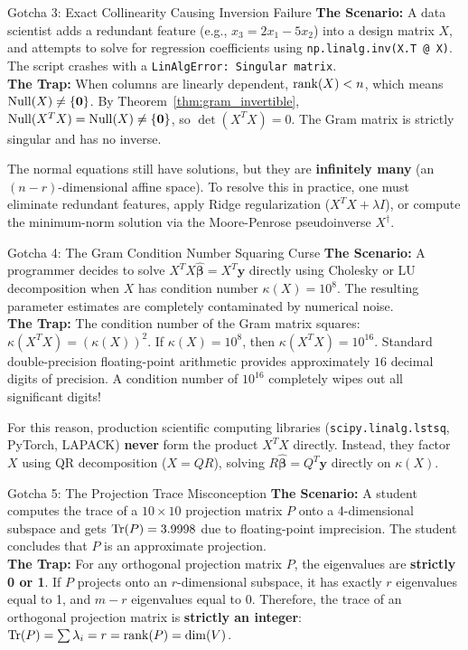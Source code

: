 \begin{trapbox}{Gotcha 3: Exact Collinearity Causing Inversion Failure}
\textbf{The Scenario:} A data scientist adds a redundant feature (e.g., $x_3 = 2x_1 - 5x_2$) into a design matrix $X$, and attempts to solve for regression coefficients using \texttt{np.linalg.inv(X.T @ X)}. The script crashes with a \texttt{LinAlgError: Singular matrix}. \\
\textbf{The Trap:} When columns are linearly dependent, $\operatorname{rank}(X) < n$, which means $\operatorname{Null}(X) \ne \{\mathbf{0}\}$. By Theorem~\ref{thm:gram_invertible}, $\operatorname{Null}(X^T X) = \operatorname{Null}(X) \ne \{\mathbf{0}\}$, so $\det(X^T X) = 0$. The Gram matrix is strictly singular and has no inverse. 

The normal equations still have solutions, but they are \textbf{infinitely many} (an $(n-r)$-dimensional affine space). To resolve this in practice, one must eliminate redundant features, apply Ridge regularization ($X^T X + \lambda I$), or compute the minimum-norm solution via the Moore-Penrose pseudoinverse $X^\dagger$.
\end{trapbox}

\begin{trapbox}{Gotcha 4: The Gram Condition Number Squaring Curse}
\textbf{The Scenario:} A programmer decides to solve $X^T X \hat{\boldsymbol{\beta}} = X^T \mathbf{y}$ directly using Cholesky or LU decomposition when $X$ has condition number $\kappa(X) = 10^8$. The resulting parameter estimates are completely contaminated by numerical noise. \\
\textbf{The Trap:} The condition number of the Gram matrix squares: $\kappa(X^T X) = (\kappa(X))^2$. If $\kappa(X) = 10^8$, then $\kappa(X^T X) = 10^{16}$. Standard double-precision floating-point arithmetic provides approximately $16$ decimal digits of precision. A condition number of $10^{16}$ completely wipes out all significant digits! 

For this reason, production scientific computing libraries (\texttt{scipy.linalg.lstsq}, PyTorch, LAPACK) \textbf{never} form the product $X^T X$ directly. Instead, they factor $X$ using QR decomposition ($X = QR$), solving $R\hat{\boldsymbol{\beta}} = Q^T \mathbf{y}$ directly on $\kappa(X)$.
\end{trapbox}

\begin{trapbox}{Gotcha 5: The Projection Trace Misconception}
\textbf{The Scenario:} A student computes the trace of a $10 \times 10$ projection matrix $P$ onto a 4-dimensional subspace and gets $\operatorname{Tr}(P) = 3.9998$ due to floating-point imprecision. The student concludes that $P$ is an approximate projection. \\
\textbf{The Trap:} For any orthogonal projection matrix $P$, the eigenvalues are \textbf{strictly 0 or 1}. If $P$ projects onto an $r$-dimensional subspace, it has exactly $r$ eigenvalues equal to 1, and $m - r$ eigenvalues equal to 0. Therefore, the trace of an orthogonal projection matrix is \textbf{strictly an integer}: $\operatorname{Tr}(P) = \sum \lambda_i = r = \operatorname{rank}(P) = \dim(V)$.
\end{trapbox}

